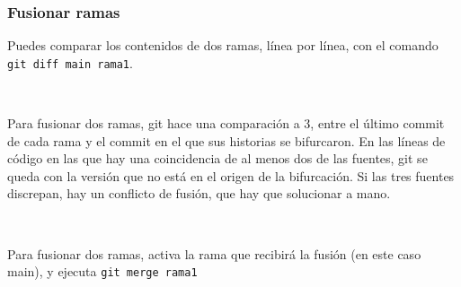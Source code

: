 \documentclass[mathserif, 10pt]{beamer}
\begin{document}
\begin{frame}\frametitle{Fusionar ramas}

    Puedes comparar los contenidos de dos ramas, línea por línea, con el comando \texttt{git diff main rama1}.

    ~

    Para fusionar dos ramas, git hace una comparación a 3, entre el último commit de cada rama y el commit en el que sus historias se bifurcaron. En las líneas de código en las que hay una coincidencia de al menos dos de las fuentes, git se queda con la versión que no está en el origen de la bifurcación. Si las tres fuentes discrepan, hay un conflicto de fusión, que hay que solucionar a mano.

    ~

    Para fusionar dos ramas, activa la rama que recibirá la fusión (en este caso main), y ejecuta \texttt{git merge rama1}
\end{frame}
\end{document}
